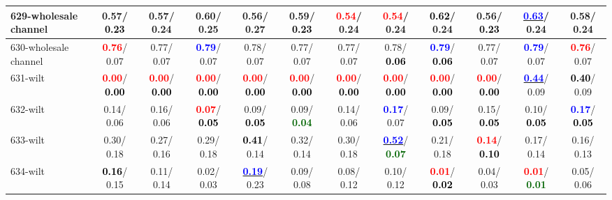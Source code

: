 \begin{table}[h]
\begin{center}
{\begin{tabular}{lc|c|c|c|c|c|c|c|c|c|c}
629-wholesale channel &   0.57/\textcolor{black}{\textbf{  0.23}} &   0.57/  0.24 &   0.60/  0.25 &   0.56/  0.27 &   0.59/\textcolor{black}{\textbf{  0.23}} & \textcolor{red}{\textbf{  0.54}}/  0.24 & \textcolor{red}{\textbf{  0.54}}/  0.24 & \textcolor{black}{\textbf{  0.62}}/  0.24 &   0.56/\textcolor{black}{\textbf{  0.23}} & \underline{\textcolor{blue}{\textbf{  0.63}}}/  0.24 &   0.58/  0.24 \\ \hline
630-wholesale channel & \textcolor{red}{\textbf{  0.76}}/  0.07 &   0.77/  0.07 & \textcolor{blue}{\textbf{  0.79}}/  0.07 &   0.78/  0.07 &   0.77/  0.07 &   0.77/  0.07 &   0.78/\textcolor{black}{\textbf{  0.06}} & \textcolor{blue}{\textbf{  0.79}}/\textcolor{black}{\textbf{  0.06}} &   0.77/  0.07 & \textcolor{blue}{\textbf{  0.79}}/  0.07 & \textcolor{red}{\textbf{  0.76}}/  0.07 \\
631-wilt & \textcolor{red}{\textbf{  0.00}}/\textcolor{black}{\textbf{  0.00}} & \textcolor{red}{\textbf{  0.00}}/\textcolor{black}{\textbf{  0.00}} & \textcolor{red}{\textbf{  0.00}}/\textcolor{black}{\textbf{  0.00}} & \textcolor{red}{\textbf{  0.00}}/\textcolor{black}{\textbf{  0.00}} & \textcolor{red}{\textbf{  0.00}}/\textcolor{black}{\textbf{  0.00}} & \textcolor{red}{\textbf{  0.00}}/\textcolor{black}{\textbf{  0.00}} & \textcolor{red}{\textbf{  0.00}}/\textcolor{black}{\textbf{  0.00}} & \textcolor{red}{\textbf{  0.00}}/\textcolor{black}{\textbf{  0.00}} & \textcolor{red}{\textbf{  0.00}}/\textcolor{black}{\textbf{  0.00}} & \underline{\textcolor{blue}{\textbf{  0.44}}}/  0.09 & \textcolor{black}{\textbf{  0.40}}/  0.09 \\
632-wilt &   0.14/  0.06 &   0.16/  0.06 & \textcolor{red}{\textbf{  0.07}}/\textcolor{black}{\textbf{  0.05}} &   0.09/\textcolor{black}{\textbf{  0.05}} &   0.09/\textcolor{darkgreen}{\textbf{  0.04}} &   0.14/  0.06 & \textcolor{blue}{\textbf{  0.17}}/  0.07 &   0.09/\textcolor{black}{\textbf{  0.05}} &   0.15/\textcolor{black}{\textbf{  0.05}} &   0.10/\textcolor{black}{\textbf{  0.05}} & \textcolor{blue}{\textbf{  0.17}}/\textcolor{black}{\textbf{  0.05}} \\
633-wilt &   0.30/  0.18 &   0.27/  0.16 &   0.29/  0.18 & \textcolor{black}{\textbf{  0.41}}/  0.14 &   0.32/  0.14 &   0.30/  0.18 & \underline{\textcolor{blue}{\textbf{  0.52}}}/\textcolor{darkgreen}{\textbf{  0.07}} &   0.21/  0.18 & \textcolor{red}{\textbf{  0.14}}/\textcolor{black}{\textbf{  0.10}} &   0.17/  0.14 &   0.16/  0.13 \\
634-wilt & \textcolor{black}{\textbf{  0.16}}/  0.15 &   0.11/  0.14 &   0.02/  0.03 & \underline{\textcolor{blue}{\textbf{  0.19}}}/  0.23 &   0.09/  0.08 &   0.08/  0.12 &   0.10/  0.12 & \textcolor{red}{\textbf{  0.01}}/\textcolor{black}{\textbf{  0.02}} &   0.04/  0.03 & \textcolor{red}{\textbf{  0.01}}/\textcolor{darkgreen}{\textbf{  0.01}} &   0.05/  0.06 \\

\end{tabular}}
\end{center}
\end{table}

